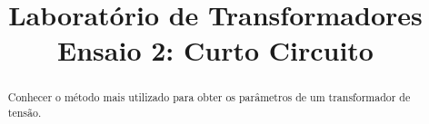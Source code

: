 \documentclass[conference]{IEEEtran}
\begin{document}
%
\title{Laboratório de Transformadores\\Ensaio 2: Curto Circuito}


\author{
}


% 








\maketitle


\begin{abstract}
Conhecer o método mais utilizado para obter os parâmetros de um transformador de tensão.
\end{abstract}
\end{document}
